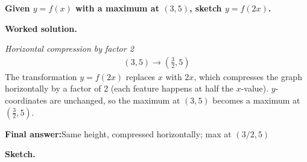 \documentclass[11pt]{article}
\newcommand{\question}[1]{\par\medskip\noindent\textbf{#1}\par}
\begin{document}
\question{Given \( y = f(x) \) with a maximum at \( (3, 5) \), sketch \( y = f(2x) \).}

\textbf{Worked solution.}

\textit{Horizontal compression by factor 2}
\[\begin{gathered}
(3, 5) \to (\tfrac{3}{2}, 5)
\end{gathered}\]
The transformation \( y = f(2x) \) replaces \( x \) with \( 2x \), which compresses the graph horizontally by a factor of 2 (each feature happens at half the \( x \)-value). \( y \)-coordinates are unchanged, so the maximum at \( (3, 5) \) becomes a maximum at \( (\tfrac{3}{2}, 5) \).

\begin{answerbox}
\textbf{Final answer:}\quad Same height, compressed horizontally; max at \(\displaystyle (3/2, 5)\)
\end{answerbox}
\textbf{Sketch.}
\end{document}
